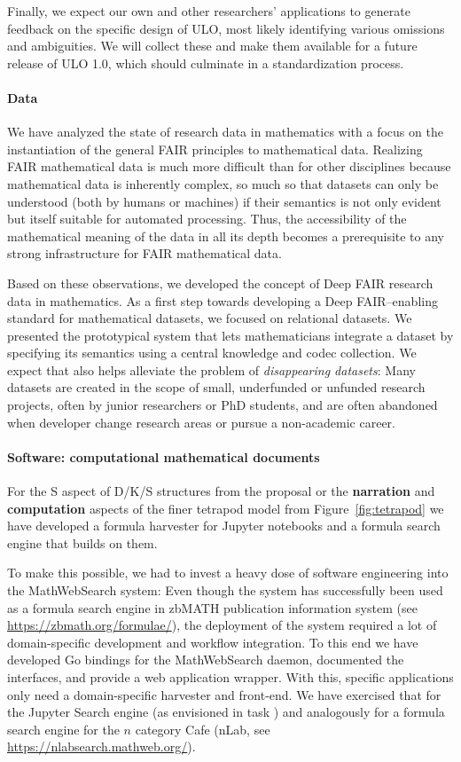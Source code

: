 Finally, we expect our own and other researchers' applications to generate feedback on the specific design of ULO, most likely identifying various omissions and ambiguities.
We will collect these and make them available for a future release of ULO 1.0, which should culminate in a standardization process.

\paragraph{Data}
We have analyzed the state of research data in mathematics with a focus on the instantiation of the general FAIR principles to mathematical data.
Realizing FAIR mathematical data is much more difficult than for other disciplines because mathematical data is inherently complex, so much so that datasets can only be understood (both by humans or machines) if their semantics is not only evident but itself suitable for automated processing.
Thus, the accessibility of the mathematical meaning of the data in all its depth becomes a prerequisite to any strong infrastructure for FAIR mathematical data.

Based on these observations, we developed the concept of Deep FAIR research data in mathematics.
As a first step towards developing a Deep FAIR--enabling standard for mathematical datasets, we focused on relational datasets.
We presented the prototypical \dmh system that lets mathematicians integrate a dataset by specifying its semantics using a central knowledge and codec collection.
We expect that \dmh also helps alleviate the problem of \emph{disappearing datasets}:
Many datasets are created in the scope of small, underfunded or unfunded research projects, often by junior researchers or PhD students, and are often abandoned when developer change research areas or pursue a non-academic career.

\paragraph{Software: computational mathematical documents}
For the S aspect of D/K/S structures from the \pn proposal or the \textbf{narration} and \textbf{computation} aspects of the finer tetrapod model from Figure~\ref{fig:tetrapod} we have developed a formula harvester for Jupyter notebooks and a formula search engine that builds on them.

To make this possible, we had to invest a heavy dose of software engineering into the MathWebSearch system: Even though the system has successfully been used as a formula search engine in zbMATH publication information system (see \url{https://zbmath.org/formulae/}), the deployment of the system required a lot of domain-specific development and workflow integration.
To this end we have developed Go bindings for the MathWebSearch daemon, documented the interfaces, and provide a web application wrapper.
With this, specific applications only need a domain-specific harvester and front-end.
We have exercised that for the Jupyter Search engine  (as envisioned in task ) and analogously for a formula search engine for the $n$ category Cafe (nLab, see \url{https://nlabsearch.mathweb.org/}).


